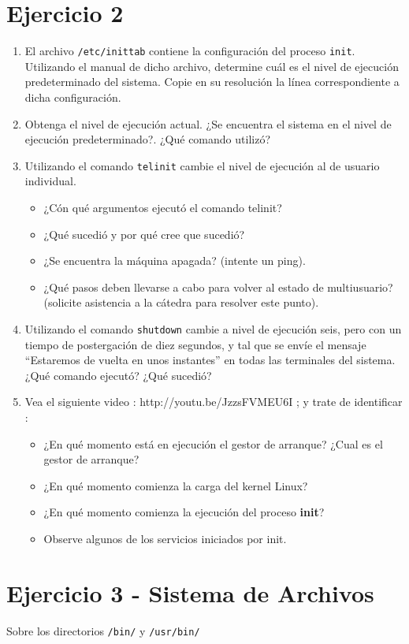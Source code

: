 \documentclass[12pt]{article}
\begin{document}
\section*{Ejercicio 2}
\begin{enumerate}
\item El archivo \texttt{/etc/inittab} contiene la configuración del proceso 
\texttt{init}. Utilizando el manual de dicho archivo, determine cuál es el 
nivel de ejecución predeterminado del sistema. Copie en su resolución la línea 
correspondiente a dicha configuración. 
\item Obtenga el nivel de ejecución actual. ¿Se encuentra el sistema en el nivel 
de ejecución predeterminado?. ¿Qué comando utilizó? 
\item Utilizando el comando \texttt{telinit} cambie el nivel de ejecución al de usuario 
individual. 
	\begin{itemize}
	\item ¿Cón qué argumentos ejecutó el comando telinit?
	\item ¿Qué sucedió y por qué cree que sucedió?
	\item ¿Se encuentra la máquina apagada? (intente un ping). 
	\item ¿Qué pasos deben llevarse a cabo para volver al estado de multiusuario? (solicite asistencia a la cátedra para resolver este punto).
	\end{itemize}
\item Utilizando el comando \texttt{shutdown} cambie a nivel de ejecución seis, pero 
con un tiempo de postergación de diez segundos, y tal que se envíe el mensaje 
``Estaremos de vuelta en unos instantes'' en todas las terminales del sistema. ¿Qué comando ejecutó? ¿Qué sucedió?
\item Vea el siguiente video : http://youtu.be/JzzsFVMEU6I  ; y trate de identificar : 
\begin{itemize}
\item ¿En qué momento está en ejecución el gestor de arranque? ¿Cual es el gestor de arranque?
\item ¿En qué momento comienza la carga del kernel Linux? 
\item ¿En qué momento comienza la ejecución del proceso \textbf{init}?
\item Observe algunos de los servicios iniciados por init.
\end{itemize}
\end{enumerate}

\section*{Ejercicio 3 - Sistema de Archivos}
Sobre los directorios \texttt{/bin/} y \texttt{/usr/bin/}
\end{document}
